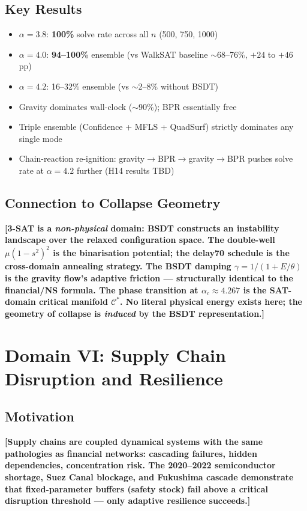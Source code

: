 \documentclass[11pt,a4paper]{article}
\newcommand{\Cman}{\mathcal{C}^*}
\begin{document}
\subsection{Key Results}
\begin{itemize}[nosep]
  \item $\alpha = 3.8$: \textbf{100\%} solve rate across all $n$ (500, 750, 1000)
  \item $\alpha = 4.0$: \textbf{94--100\%} ensemble
        (vs WalkSAT baseline $\sim$68--76\%, $+24$ to $+46$ pp)
  \item $\alpha = 4.2$: 16--32\% ensemble (vs $\sim$2--8\% without BSDT)
  \item Gravity dominates wall-clock ($\sim$90\%); BPR essentially free
  \item Triple ensemble (Confidence + MFLS + QuadSurf) strictly dominates
        any single mode
  \item Chain-reaction re-ignition: gravity$\to$BPR$\to$gravity$\to$BPR
        pushes solve rate at $\alpha = 4.2$ further (H14 results TBD)
\end{itemize}

\subsection{Connection to Collapse Geometry}
\textbf{[3-SAT is a \emph{non-physical} domain: BSDT constructs
an instability landscape over the relaxed configuration space.
The double-well $\mu(1-s^2)^2$ is the binarisation potential;
the delay70 schedule is the cross-domain annealing strategy.
The BSDT damping $\gamma = 1/(1 + E/\theta)$ is the gravity
flow's adaptive friction --- structurally identical to the
financial/NS formula.  The phase transition at
$\alpha_c \approx 4.267$ is the SAT-domain critical manifold
$\Cman$.  No literal physical energy exists here; the geometry
of collapse is \emph{induced} by the BSDT representation.]}


\section{Domain VI: Supply Chain Disruption and Resilience}\label{sec:supply}

\subsection{Motivation}
\textbf{[Supply chains are coupled dynamical systems with the same
pathologies as financial networks: cascading failures, hidden
dependencies, concentration risk.  The 2020--2022 semiconductor
shortage, Suez Canal blockage, and Fukushima cascade demonstrate
that fixed-parameter buffers (safety stock) fail above a critical
disruption threshold — only adaptive resilience succeeds.]}
\end{document}
